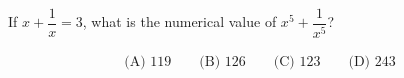 If $x + \dfrac{1}{x} = 3$, what is the numerical value of $x^5 + \dfrac{1}{x^5}$?



\begin{align*}\text{(A) }119 \qquad
\text{(B) }126 \qquad
\text{(C) }123 \qquad
\text{(D) }243 \end{align*}
